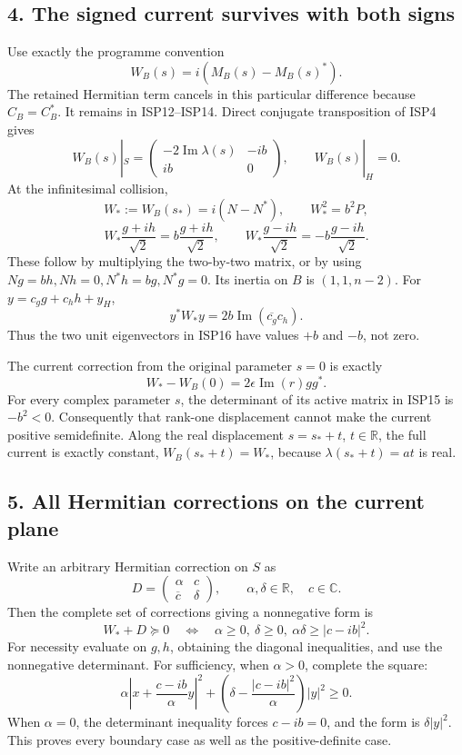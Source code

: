 \documentclass[
  10pt,
  a4paper,
]{article}
\begin{document}
\subsection{4. The signed current survives with both
signs}\label{the-signed-current-survives-with-both-signs}

Use exactly the programme convention \[
W_B(s)=i(M_B(s)-M_B(s)^*).
\] The retained Hermitian term cancels in this particular difference
because \(C_B=C_B^*\). It remains in ISP12--ISP14. Direct conjugate
transposition of ISP4 gives \[
W_B(s)|_S=
\begin{pmatrix}-2\operatorname{Im}\lambda(s)&-ib\\ib&0\end{pmatrix},
\qquad W_B(s)|_H=0.
\tag{ISP15}
\] At the infinitesimal collision, \[
W_*:=W_B(s_*)=i(N-N^*),\qquad
W_*^2=b^2P,
\] \[
W_*\frac{g+ih}{\sqrt2}=b\frac{g+ih}{\sqrt2},\qquad
W_*\frac{g-ih}{\sqrt2}=-b\frac{g-ih}{\sqrt2}.
\tag{ISP16}
\] These follow by multiplying the two-by-two matrix, or by using
\(Ng=bh,Nh=0,N^*h=bg,N^*g=0\). Its inertia on \(B\) is \((1,1,n-2)\).
For \(y=c_g g+c_hh+y_H\), \[
y^*W_*y=2b\operatorname{Im}(\overline{c_g}c_h).
\tag{ISP17}
\] Thus the two unit eigenvectors in ISP16 have values \(+b\) and
\(-b\), not zero.

The current correction from the original parameter \(s=0\) is exactly \[
W_*-W_B(0)=2\epsilon\operatorname{Im}(r)gg^*.
\tag{ISP18}
\] For every complex parameter \(s\), the determinant of its active
matrix in ISP15 is \(-b^2<0\). Consequently that rank-one displacement
cannot make the current positive semidefinite. Along the real
displacement \(s=s_*+t\), \(t\in\mathbb R\), the full current is exactly
constant, \(W_B(s_*+t)=W_*\), because \(\lambda(s_*+t)=at\) is real.

\subsection{5. All Hermitian corrections on the current
plane}\label{all-hermitian-corrections-on-the-current-plane}

Write an arbitrary Hermitian correction on \(S\) as \[
D=\begin{pmatrix}\alpha&c\\\overline c&\delta\end{pmatrix},
\qquad\alpha,\delta\in\mathbb R,\quad c\in\mathbb C.
\] Then the complete set of corrections giving a nonnegative form is \[
\boxed{W_*+D\succeq0
\quad\Longleftrightarrow\quad
\alpha\ge0,\ \delta\ge0,\ \alpha\delta\ge|c-ib|^2.}
\tag{ISP19}
\] For necessity evaluate on \(g,h\), obtaining the diagonal
inequalities, and use the nonnegative determinant. For sufficiency, when
\(\alpha>0\), complete the square: \[
\alpha\left|x+\frac{c-ib}{\alpha}y\right|^2
+\left(\delta-\frac{|c-ib|^2}{\alpha}\right)|y|^2\ge0.
\] When \(\alpha=0\), the determinant inequality forces \(c-ib=0\), and
the form is \(\delta|y|^2\). This proves every boundary case as well as
the positive-definite case.
\end{document}
